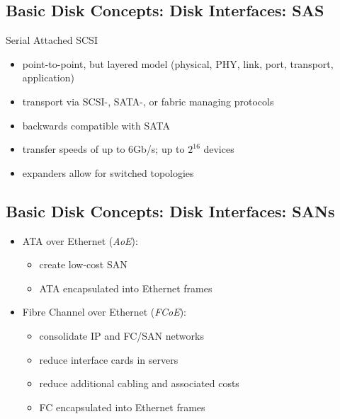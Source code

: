 \documentclass[xga]{xdvislides}
\begin{document}
\subsection{Basic Disk Concepts: Disk Interfaces: SAS}
Serial Attached SCSI
\begin{itemize}
	\item point-to-point, but layered model (physical, PHY, link,
		port, transport, application)
	\item transport via SCSI-, SATA-, or fabric managing protocols
	\item backwards compatible with SATA
	\item transfer speeds of up to 6Gb/s; up to $2^{16}$ devices
	\item expanders allow for switched topologies
\end{itemize}




\subsection{Basic Disk Concepts: Disk Interfaces: SANs}
\begin{itemize}
	\item ATA over Ethernet ({\em AoE}):
		\begin{itemize}
			\item create low-cost SAN
			\item ATA encapsulated into Ethernet frames
		\end{itemize}
	\item Fibre Channel over Ethernet ({\em FCoE}):
		\begin{itemize}
			\item consolidate IP and FC/SAN networks
			\item reduce interface cards in servers
			\item reduce additional cabling and associated costs
			\item FC encapsulated into Ethernet frames
		\end{itemize}
\end{itemize}
\end{document}
